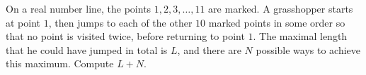 On a real number line, the points $1, 2, 3, \dots, 11$ are marked. A grasshopper starts at point $1$, then jumps to each of the other $10$ marked points in some order so that no point is visited twice, before returning to point $1$. The maximal length that he could have jumped in total is $L$, and there are $N$ possible ways to achieve this maximum. Compute $L+N$.
